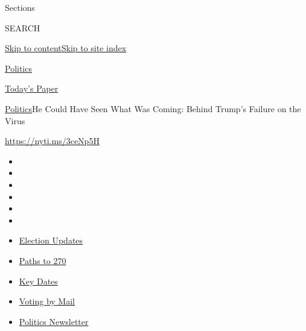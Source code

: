 Sections

SEARCH

\protect\hyperlink{site-content}{Skip to
content}\protect\hyperlink{site-index}{Skip to site index}

\href{https://www.nytimes3xbfgragh.onion/section/politics}{Politics}

\href{https://myaccount.nytimes3xbfgragh.onion/auth/login?response_type=cookie\&client_id=vi}{}

\href{https://www.nytimes3xbfgragh.onion/section/todayspaper}{Today's
Paper}

\href{/section/politics}{Politics}\textbar{}He Could Have Seen What Was
Coming: Behind Trump's Failure on the Virus

\url{https://nyti.ms/3ceNp5H}

\begin{itemize}
\item
\item
\item
\item
\item
\item
\end{itemize}

\begin{itemize}
\item
  \href{https://www.nytimes3xbfgragh.onion/live/2020/09/11/us/trump-vs-biden?action=click\&pgtype=Article\&state=default\&region=TOP_BANNER\&context=storylines_menu}{Election
  Updates}
\item
  \href{https://www.nytimes3xbfgragh.onion/interactive/2020/us/elections/election-states-biden-trump.html?action=click\&pgtype=Article\&state=default\&region=TOP_BANNER\&context=storylines_menu}{Paths
  to 270}
\item
  \href{https://www.nytimes3xbfgragh.onion/interactive/2019/us/elections/2020-presidential-election-calendar.html?action=click\&pgtype=Article\&state=default\&region=TOP_BANNER\&context=storylines_menu}{Key
  Dates}
\item
  \href{https://www.nytimes3xbfgragh.onion/interactive/2020/08/31/us/politics/vote-by-mail-deadlines.html?action=click\&pgtype=Article\&state=default\&region=TOP_BANNER\&context=storylines_menu}{Voting
  by Mail}
\item
  \href{https://www.nytimes3xbfgragh.onion/newsletters/politics?action=click\&pgtype=Article\&state=default\&region=TOP_BANNER\&context=storylines_menu}{Politics
  Newsletter}
\end{itemize}

